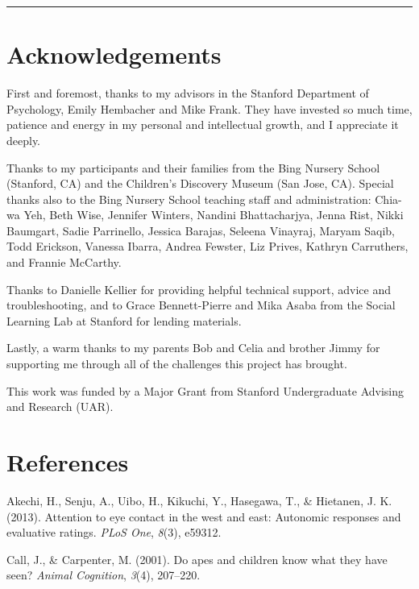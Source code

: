 \documentclass[floatsintext,man]{apa6}
\theoremstyle{definition}
\theoremstyle{definition}
\theoremstyle{definition}
\theoremstyle{remark}
\begin{document}
\begin{center}\rule{0.5\linewidth}{\linethickness}\end{center}

\section{Acknowledgements}\label{acknowledgements}

First and foremost, thanks to my advisors in the Stanford Department of
Psychology, Emily Hembacher and Mike Frank. They have invested so much
time, patience and energy in my personal and intellectual growth, and I
appreciate it deeply.

Thanks to my participants and their families from the Bing Nursery
School (Stanford, CA) and the Children's Discovery Museum (San Jose,
CA). Special thanks also to the Bing Nursery School teaching staff and
administration: Chia-wa Yeh, Beth Wise, Jennifer Winters, Nandini
Bhattacharjya, Jenna Rist, Nikki Baumgart, Sadie Parrinello, Jessica
Barajas, Seleena Vinayraj, Maryam Saqib, Todd Erickson, Vanessa Ibarra,
Andrea Fewster, Liz Prives, Kathryn Carruthers, and Frannie McCarthy.

Thanks to Danielle Kellier for providing helpful technical support,
advice and troubleshooting, and to Grace Bennett-Pierre and Mika Asaba
from the Social Learning Lab at Stanford for lending materials.

Lastly, a warm thanks to my parents Bob and Celia and brother Jimmy for
supporting me through all of the challenges this project has brought.

This work was funded by a Major Grant from Stanford Undergraduate
Advising and Research (UAR).

\newpage

\section{References}\label{references}

\setlength{\parindent}{-0.5in} \setlength{\leftskip}{0.5in}

\hypertarget{refs}{}
\hypertarget{ref-akechi2013attention}{}
Akechi, H., Senju, A., Uibo, H., Kikuchi, Y., Hasegawa, T., \& Hietanen,
J. K. (2013). Attention to eye contact in the west and east: Autonomic
responses and evaluative ratings. \emph{PLoS One}, \emph{8}(3), e59312.

\hypertarget{ref-call2001apes}{}
Call, J., \& Carpenter, M. (2001). Do apes and children know what they
have seen? \emph{Animal Cognition}, \emph{3}(4), 207--220.
\end{document}
